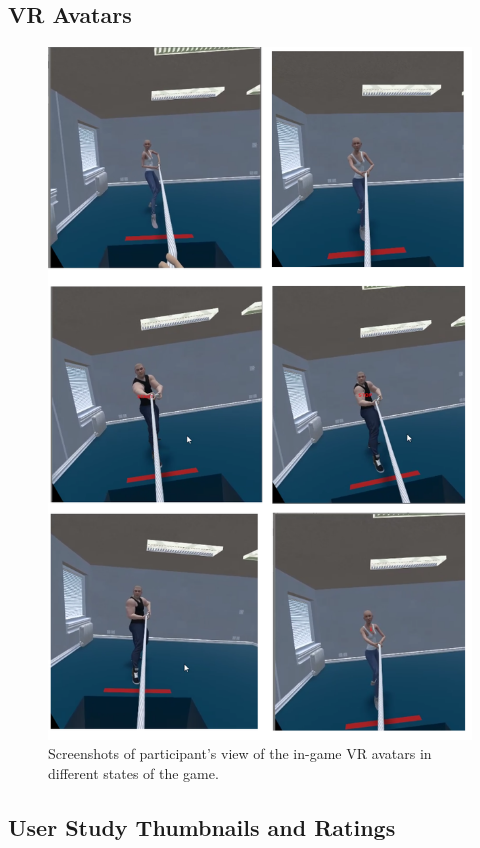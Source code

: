 \subsection{VR Avatars}
\label{subsection:vravatars}
\begin{figure}
\includegraphics[scale=0.7]{Images/avatars.png}
\caption{Screenshots of participant's view of the in-game VR avatars in different states of the game.}
\end{figure}

\clearpage
\subsection{User Study Thumbnails and Ratings}
\label{subsection:thumbnailsExperiment}
